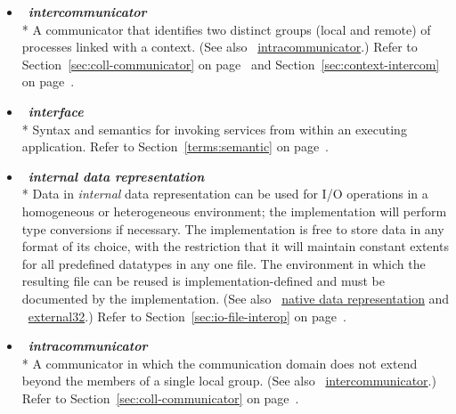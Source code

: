 \begin{itemize}
\label{glossary:intercommunicator}
\item  ~\hypertarget{glossary:intercommunicator}{\emph{\textbf{intercommunicator}}} \\*
A communicator that identifies two distinct groups (local and remote) of processes
linked with a context.  (See also ~\hyperlink{glossary:intracommunicator}{intracommunicator}.)
Refer to Section~\ref{sec:coll-communicator} on page~\pageref{sec:coll-communicator}  
and Section~\ref{sec:context-intercom} on page~\pageref{sec:context-intercom}.

\label{glossary:interface}
\item  ~\hypertarget{glossary:interface}{\emph{\textbf{interface}}} \\*
Syntax and semantics for invoking services from within an executing application.  
Refer to Section~\ref{terms:semantic} on page~\pageref{terms:semantic}.

\label{glossary:internal_data_representation}
\item  ~\hypertarget{glossary:internal_data_representation}{\emph{\textbf{internal data representation}}} \\*
Data in \emph{internal} data representation can be used for I/O operations in a homogeneous or
heterogeneous environment; the implementation will perform type
conversions if necessary. The implementation is free to store data in
any format of its choice,
with the restriction that it will maintain constant extents
for all predefined datatypes in any one file.
The environment in which the resulting file 
can be reused is implementation-defined
and must be documented by the implementation.
(See also ~\hyperlink{glossary:native_data_representation}{native data representation} and ~\hyperlink{glossary:external32}{external32}.)
Refer to Section~\ref{sec:io-file-interop} on page~\pageref{sec:io-file-interop}.

\label{glossary:intracommunicator}
\item  ~\hypertarget{glossary:intracommunicator}{\emph{\textbf{intracommunicator}}} \\*
A communicator in which the communication domain does not extend beyond the members of a single local group. 
(See also ~\hyperlink{glossary:intercommunicator}{intercommunicator}.)
Refer to Section~\ref{sec:coll-communicator} on page~\pageref{sec:coll-communicator}.


\end{itemize}
